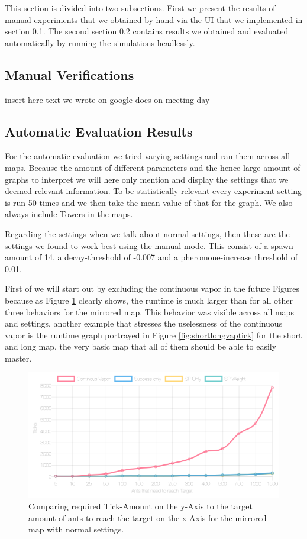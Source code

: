 This section is divided into two subsections. First we present the results of manual experiments that we obtained by hand via the UI that we implemented in section \ref{sec:manualver}.
The second section \ref{sec:autover} contains results we obtained and evaluated automatically by running the simulations headlessly.

\subsection{Manual Verifications}
\label{sec:manualver}
insert here text we wrote on google docs on meeting day


\subsection{Automatic Evaluation Results}
\label{sec:autover}
For the automatic evaluation we tried varying settings and ran them across all maps. Because the amount of different parameters and the hence large amount of graphs to interpret we will here only mention and display the settings that we deemed relevant information. To be statistically relevant every experiment setting is run 50 times and we then take the mean value of that for the graph. We also always include Towers in the maps.

Regarding the settings when we talk about normal settings, then these are the settings we found to work best using the manual mode. This consist of a spawn-amount of 14, a decay-threshold of -0.007 and a pheromone-increase threshold of 0.01.

First of we will start out by excluding the continuous vapor in the future Figures because as Figure \ref{fig:mirrorvaptick} clearly shows, the runtime is much larger than for all other three behaviors for the mirrored map. This behavior was visible across all maps and settings, another example that stresses the uselessness of the continuous vapor is the runtime graph portrayed in Figure \ref{fig:shortlongvaptick} for the short and long map, the very basic map that all of them should be able to easily master.

\begin{figure}[H]
  \centering
  \includegraphics[width=1\linewidth]{images/normalmirroredwithtower-ticks-line}
  \caption{Comparing required Tick-Amount on the y-Axis to the target amount of ants to reach the target on the x-Axis for the mirrored map with normal settings.}
  \label{fig:mirrorvaptick}
\end{figure}

